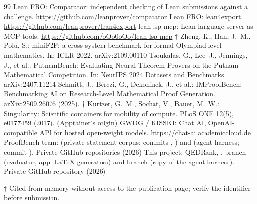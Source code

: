 \documentclass[11pt,a4paper]{article}
\begin{document}
\begin{thebibliography}{99}
 Lean FRO: Comparator: independent checking of Lean submissions against a challenge. \url{https://github.com/leanprover/comparator}
 Lean FRO: lean4export. \url{https://github.com/leanprover/lean4export}
 lean-lsp-mcp: Lean language server as MCP tools. \url{https://github.com/oOo0oOo/lean-lsp-mcp} $\dagger$
 Zheng, K., Han, J.~M., Polu, S.: miniF2F: a cross-system benchmark for formal Olympiad-level mathematics. In: ICLR 2022. arXiv:2109.00110
 Tsoukalas, G., Lee, J., Jennings, J., et al.: PutnamBench: Evaluating Neural Theorem-Provers on the Putnam Mathematical Competition. In: NeurIPS 2024 Datasets and Benchmarks. arXiv:2407.11214
 Schmitt, J., B\'erczi, G., Dekoninck, J., et al.: IMProofBench: Benchmarking AI on Research-Level Mathematical Proof Generation. arXiv:2509.26076 (2025). $\dagger$
 Kurtzer, G.~M., Sochat, V., Bauer, M.~W.: Singularity: Scientific containers for mobility of compute. PLoS ONE 12(5), e0177459 (2017). (Apptainer's origin)
 GWDG / KISSKI: Chat AI, OpenAI-compatible API for hosted open-weight models. \url{https://chat-ai.academiccloud.de}
 ProofBench team:  (private statement corpus; commits , ) and  (agent harness; commit ). Private GitHub repositories (2026)
 This project: QEDRank, , branch  (evaluator, app, LaTeX generators) and branch  (copy of the agent harness). Private GitHub repository (2026)
\end{thebibliography}

\noindent $\dagger$ Cited from memory without access to the publication page; verify the identifier before submission.
\end{document}
